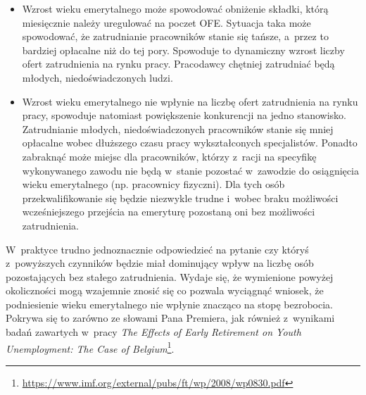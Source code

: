\documentclass[12pt]{article}
\begin{document}
    \begin{itemize}
        \item Wzrost wieku emerytalnego może spowodować obniżenie składki, którą miesięcznie należy uregulować na poczet OFE. Sytuacja taka może spowodować, że zatrudnianie pracowników stanie się tańsze, a~przez to bardziej opłacalne niż do tej pory. Spowoduje to dynamiczny wzrost liczby ofert zatrudnienia na rynku pracy. Pracodawcy chętniej zatrudniać będą młodych, niedoświadczonych ludzi.
        \item Wzrost wieku emerytalnego nie wpłynie na liczbę ofert zatrudnienia na rynku pracy, spowoduje natomiast powiększenie konkurencji na jedno stanowisko. Zatrudnianie młodych, niedoświadczonych pracowników stanie się mniej opłacalne wobec dłuższego czasu pracy wykształconych specjalistów. Ponadto zabraknąć może miejsc dla pracowników, którzy z~racji na specyfikę wykonywanego zawodu nie będą w~stanie pozostać w~zawodzie do osiągnięcia wieku emerytalnego (np. pracownicy fizyczni). Dla tych osób przekwalifikowanie się będzie niezwykle trudne i~wobec braku możliwości wcześniejszego przejścia na emeryturę pozostaną oni bez możliwości zatrudnienia. 
    \end{itemize}
 
    W~praktyce trudno jednoznacznie odpowiedzieć na pytanie czy któryś z~powyższych czynników będzie miał dominujący wpływ na liczbę osób pozostających bez stałego zatrudnienia. Wydaje się, że wymienione powyżej okoliczności mogą wzajemnie znosić się co pozwala wyciągnąć wniosek, że podniesienie wieku emerytalnego nie wpłynie znacząco na stopę bezrobocia. Pokrywa się to zarówno ze słowami Pana Premiera, jak również z~wynikami badań zawartych w~pracy \emph{The Effects of Early Retirement on Youth Unemployment: The Case of Belgium}\footnote{\url{https://www.imf.org/external/pubs/ft/wp/2008/wp0830.pdf}}.
        
\end{document}
